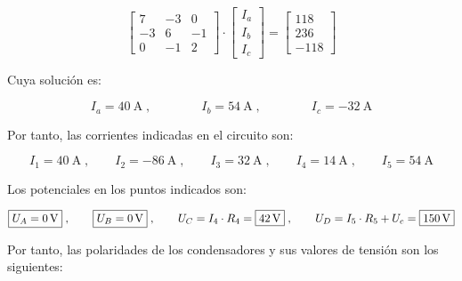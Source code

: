\documentclass[10pt]{article}
\begin{document}
\begin{equation*}
    \begin{bmatrix}
        7 & -3 & 0\\
        -3 & 6 & -1\\
        0 & -1 & 2
    \end{bmatrix} \cdot %
    \begin{bmatrix}
        I_{a}\\
        I_{b}\\
        I_{c}
    \end{bmatrix} = %
    \begin{bmatrix}
        118\\
        236\\
        -118
    \end{bmatrix}
\end{equation*}  

Cuya solución es:

\vspace{-3mm}
\begin{equation*}
    I_a = \qty{40}{\ampere} \; , \qquad\qquad
    I_b = \qty{54}{\ampere} \; , \qquad\qquad
    I_c = -\qty{32}{\ampere}
\end{equation*}

\vspace{2mm}
Por tanto, las corrientes indicadas en el circuito son:

\vspace{-1mm}
\begin{equation*}
    \boxed{I_1 = \qty{40}{\ampere}}  \; , \qquad
    \boxed{I_2 = \qty{-86}{\ampere}}  \; , \qquad
    \boxed{I_3 = \qty{32}{\ampere}}  \; , \qquad
    \boxed{I_4 = \qty{14}{\ampere}}  \; , \qquad
    \boxed{I_5 = \qty{54}{\ampere}}
\end{equation*}

\vspace{4mm}
Los potenciales en los puntos indicados son:

\vspace{-2mm}
\begin{equation*}
    \boxed{U_A = \qty{0}{\volt}}  \; , \qquad
    \boxed{U_B = \qty{0}{\volt}}  \; , \qquad
    U_C = I_4 \cdot R_4 = \boxed{\qty{42}{\volt}}  \; , \qquad
    U_D = I_5 \cdot R_5 + U_c = \boxed{\qty{150}{\volt}}\\
\end{equation*}

\vspace{3mm}
Por tanto, las polaridades de los condensadores y sus valores de tensión son los siguientes:
\end{document}

